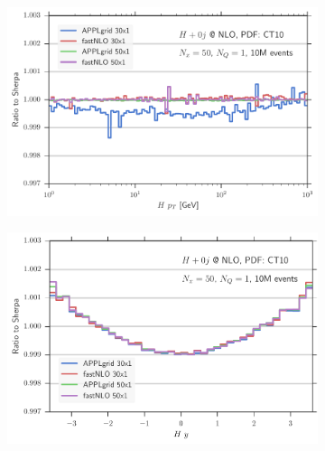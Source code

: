 %
\begin{figure}
\centering
\begin{subfigure}[]{0.49\textwidth}
	\includegraphics[width=\textwidth]{images/hnlo_hpt_50v30.pdf}
\end{subfigure}
\hfill
\begin{subfigure}[]{0.49\textwidth}
	\includegraphics[width=\textwidth]{images/hnlo_hy_50v30.pdf}
\end{subfigure}


\end{figure}
